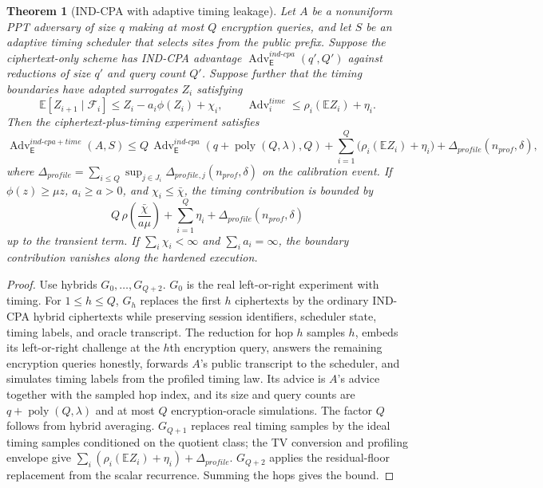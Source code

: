 \documentclass[11pt]{article}
\theoremstyle{definition}
\theoremstyle{plain}
\newtheorem{theorem}[definition]{Theorem}
\theoremstyle{remark}
\DeclareMathOperator{\poly}{poly}
\newcommand{\E}{\mathbb{E}}
\newcommand{\cF}{\mathcal{F}}
\newcommand{\Adv}{\operatorname{Adv}}
\begin{document}
\begin{theorem}[IND-CPA with adaptive timing leakage]
Let $A$ be a nonuniform PPT adversary of size $q$ making at most $Q$ encryption queries, and let $S$ be an adaptive timing scheduler that selects sites from the public prefix. Suppose the ciphertext-only scheme has IND-CPA advantage $\Adv^{ind\text{-}cpa}_{\mathsf E}(q',Q')$ against reductions of size $q'$ and query count $Q'$. Suppose further that the timing boundaries have adapted surrogates $Z_i$ satisfying
\[
\E[Z_{i+1}\mid\cF_i]\le Z_i-a_i\phi(Z_i)+\chi_i,
\qquad
\Adv_i^{time}\le \rho_i(\E Z_i)+\eta_i.
\]
Then the ciphertext-plus-timing experiment satisfies
\[
\Adv_{\mathsf E}^{ind\text{-}cpa+time}(A,S)
\le
Q\,\Adv^{ind\text{-}cpa}_{\mathsf E}(q+\poly(Q,\lambda),Q)
+\sum_{i=1}^Q\bigl(\rho_i(\E Z_i)+\eta_i\bigr)
+\Delta_{profile}(n_{prof},\delta),
\]
where $\Delta_{profile}=\sum_{i\le Q}\sup_{j\in J_i}\Delta_{profile,j}(n_{prof},\delta)$ on the calibration event. If $\phi(z)\ge\mu z$, $a_i\ge a>0$, and $\chi_i\le\bar\chi$, the timing contribution is bounded by
\[
Q\,\rho\!\left(\frac{\bar\chi}{a\mu}\right)+\sum_{i=1}^Q\eta_i+\Delta_{profile}(n_{prof},\delta)
\]
up to the transient term. If $\sum_i\chi_i<\infty$ and $\sum_i a_i=\infty$, the boundary contribution vanishes along the hardened execution.
\end{theorem}

\begin{proof}
Use hybrids $G_0,\ldots,G_{Q+2}$. $G_0$ is the real left-or-right experiment with timing. For $1\le h\le Q$, $G_h$ replaces the first $h$ ciphertexts by the ordinary IND-CPA hybrid ciphertexts while preserving session identifiers, scheduler state, timing labels, and oracle transcript. The reduction for hop $h$ samples $h$, embeds its left-or-right challenge at the $h$th encryption query, answers the remaining encryption queries honestly, forwards $A$'s public transcript to the scheduler, and simulates timing labels from the profiled timing law. Its advice is $A$'s advice together with the sampled hop index, and its size and query counts are $q+\poly(Q,\lambda)$ and at most $Q$ encryption-oracle simulations. The factor $Q$ follows from hybrid averaging. $G_{Q+1}$ replaces real timing samples by the ideal timing samples conditioned on the quotient class; the TV conversion and profiling envelope give $\sum_i(\rho_i(\E Z_i)+\eta_i)+\Delta_{profile}$. $G_{Q+2}$ applies the residual-floor replacement from the scalar recurrence. Summing the hops gives the bound.
\end{proof}
\end{document}
